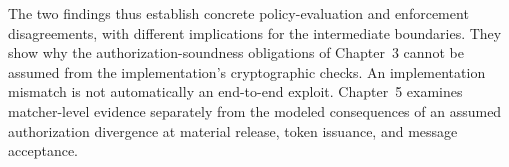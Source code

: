 The two findings thus establish concrete policy-evaluation and enforcement
disagreements, with different implications for the intermediate boundaries.
They show why the authorization-soundness obligations of Chapter~3 cannot be
assumed from the implementation's cryptographic checks. An implementation
mismatch is not automatically an end-to-end exploit. Chapter~5 examines
matcher-level evidence separately from the modeled consequences of an assumed
authorization divergence at material release, token issuance, and message
acceptance.

